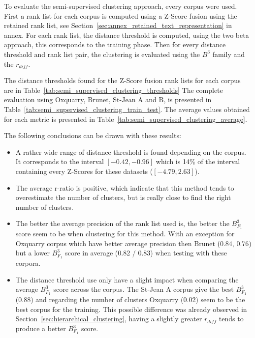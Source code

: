To evaluate the semi-supervised clustering approach, every corpus were used.
First a rank list for each corpus is computed using a Z-Score fusion using the retained rank list, see Section~\ref{sec:annex_retained_text_representation} in annex.
For each rank list, the distance threshold is computed, using the two beta approach, this corresponds to the training phase.
Then for every distance threshold and rank list pair, the clustering is evaluated using the $B^3$ family and the $r_{diff}$.

The distance thresholds found for the Z-Score fusion rank lists for each corpus are in Table~\ref{tab:semi_supervised_clustering_thresholds}
The complete evaluation using Oxquarry, Brunet, St-Jean A and B, is presented in Table~\ref{tab:semi_supervised_clustering_train_test}.
The average values obtained for each metric is presented in Table~\ref{tab:semi_supervised_clustering_average}.

The following conclusions can be drawn with these results:
\begin{itemize}
  \item
  A rather wide range of distance threshold is found depending on the corpus.
  It corresponds to the interval $\left[-0.42, -0.96\right]$ which is 14\% of the interval containing every Z-Scores for these datasets ($\left[-4.79, 2.63\right]$).
  \item
  The average r-ratio is positive, which indicate that this method tends to overestimate the number of clusters, but is really close to find the right number of clusters.
  \item
  The better the average precision of the rank list used is, the better the $B^3_{F_1}$ score seem to be when clustering for this method.
  With an exception for Oxquarry corpus which have better average precision then Brunet (0.84, 0.76) but a lower $B^3_{F_1}$ score in average (0.82 / 0.83) when testing with these corpora.
  \item
  The distance threshold use only have a slight impact when comparing the average $B^3_{F_1}$ score across the corpus.
  The St-Jean A corpus give the best $B^3_{F_1}$ (0.88) and regarding the number of clusters Oxquarry (0.02) seem to be the best corpus for the training.
  This possible difference was already observed in Section~\ref{sec:hierarchical_clustering}, having a slightly greater $r_{diff}$ tends to produce a better $B^3_{F_1}$ score.
\end{itemize}

